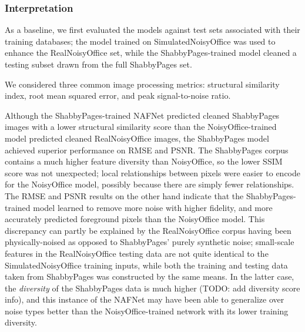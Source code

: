 \documentclass[runningheads]{llncs}
\begin{document}
\begin{table}[]
    \centering
    \caption{Document image binarization performance of a NAFNet model trained and tested on ShabbyPages and NoisyOffice.}
    \label{tab:binarization_results}
\end{table}

\subsubsection{Interpretation}
As a baseline, we first evaluated the models against test sets associated with their training databases; the model trained on SimulatedNoisyOffice was used to enhance the RealNoisyOffice set, while the ShabbyPages-trained model cleaned a testing subset drawn from the full ShabbyPages set.

We considered three common image processing metrics: structural similarity index, root mean squared error, and peak signal-to-noise ratio.

Although the ShabbyPages-trained NAFNet predicted cleaned ShabbyPages images with a lower structural similarity score than the NoisyOffice-trained model predicted cleaned RealNoisyOffice images, the ShabbyPages model achieved superior performance on RMSE and PSNR.
The ShabbyPages corpus contains a much higher feature diversity than NoisyOffice, so the lower SSIM score was not unexpected; local relationships between pixels were easier to encode for the NoisyOffice model, possibly because there are simply fewer relationships.
The RMSE and PSNR results on the other hand indicate that the ShabbyPages-trained model learned to remove more noise with higher fidelity, and more accurately predicted foreground pixels than the NoisyOffice model.
This discrepancy can partly be explained by the RealNoisyOffice corpus having been physically-noised as opposed to ShabbyPages' purely synthetic noise; small-scale features in the RealNoisyOffice testing data are not quite identical to the SimulatedNoisyOffice training inputs, while both the training and testing data taken from ShabbyPages was constructed by the same means.
In the latter case, the \textit{diversity} of the ShabbyPages data is much higher (TODO: add diversity score info), and this instance of the NAFNet may have been able to generalize over noise types better than the NoisyOffice-trained network with its lower training diversity.
\end{document}
